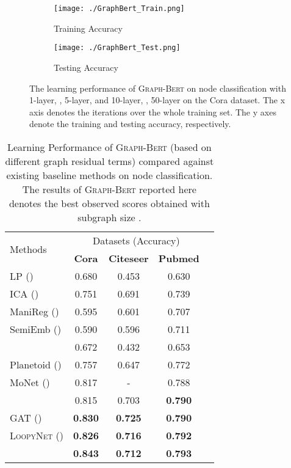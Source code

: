 \documentclass{article}
\newcommand{\our}{\textsc{Graph-Bert}}
\newcommand{\gcn}{\textsc{GCN}}
\newcommand{\gat}{\textsc{GAT}}
\newcommand{\loopy}{\textsc{LoopyNet}}
\begin{document}
\begin{figure}[t]
    \centering
    \begin{subfigure}[b]{.23\textwidth}
    	\texttt{[image: ./GraphBert\_Train.png]}
    	\caption{Training Accuracy}\label{fig:acc_train}
    \end{subfigure}\hfill
    \begin{subfigure}[b]{.23\textwidth}
    	\texttt{[image: ./GraphBert\_Test.png]}
    	\caption{Testing Accuracy}\label{fig:acc_test}
    \end{subfigure}\caption{The learning performance of {\our} on node classification with 1-layer, , 5-layer, and 10-layer, , 50-layer on the Cora dataset. The x axis denotes the iterations over the whole training set. The y axes denote the training and testing accuracy, respectively.}\label{fig:graph_bert_acc_analysis}
\end{figure}



\begin{table}[t]
\caption{Learning Performance of {\our} (based on different graph residual terms) compared against existing baseline methods on node classification. The results of {\our} reported here denotes the best observed scores obtained with subgraph size .}\label{tab:node_classification}
\centering
\small
\setlength{\tabcolsep}{3pt}
\begin{tabular}{l c c c c }
\toprule
 \multirow{2}{*}{Methods}  & \multicolumn{3}{c}{Datasets (Accuracy)} \\
\cline{2-4}
\addlinespace[0.05cm]
& \textbf{Cora} & \textbf{Citeseer} & \textbf{Pubmed} \\
\hline
\addlinespace[0.05cm]

{LP (\cite{ZGL03}) } &0.680 &0.453 &0.630  \\
{ICA (\cite{LG03})} &0.751  &0.691  &0.739   \\
{ManiReg (\cite{BNS06})} &0.595  &0.601  &0.707   \\
{SemiEmb (\cite{WRC08})} &0.590  &0.596  &0.711  \\
\hline
\addlinespace[0.05cm]
{DeepWalk (\cite{PAS14})} &0.672  &0.432  &0.653   \\
{Planetoid (\cite{YCS16})} &0.757  &0.647  &0.772  \\
{MoNet (\cite{MBMRSB16})} &0.817  &-  &0.788  \\
\hline
\addlinespace[0.05cm]
{{\gcn} (\cite{Kipf_Semi_CORR_16})} &0.815  &0.703  &\textbf{0.790}   \\
{{\gat} (\cite{Velickovic_Graph_ICLR_18})} &\textbf{0.830}  &\textbf{0.725}  &\textbf{0.790}  \\
{{\loopy} (\cite{loopynet})} &\textbf{0.826}  &\textbf{0.716}  &\textbf{0.792}  \\
\hline
\addlinespace[0.05cm]
{\our} &\textbf{0.843}  &\textbf{0.712}  &\textbf{0.793}  \\
\bottomrule
\end{tabular}
\end{table}
\end{document}
